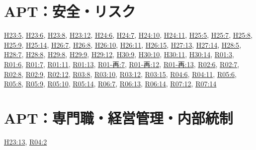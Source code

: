 \section{APT：安全・リスク}
\hyperref[q:h23-reg-apt-05]{H23:5}, \hyperref[q:h23-reg-apt-06]{H23:6}, \hyperref[q:h23-reg-apt-08]{H23:8}, \hyperref[q:h23-reg-apt-12]{H23:12}, \hyperref[q:h24-reg-apt-06]{H24:6}, \hyperref[q:h24-reg-apt-07]{H24:7}, \hyperref[q:h24-reg-apt-10]{H24:10}, \hyperref[q:h24-reg-apt-11]{H24:11}, \hyperref[q:h25-reg-apt-05]{H25:5}, \hyperref[q:h25-reg-apt-07]{H25:7}, \hyperref[q:h25-reg-apt-08]{H25:8}, \hyperref[q:h25-reg-apt-09]{H25:9}, \hyperref[q:h25-reg-apt-14]{H25:14}, \hyperref[q:h26-reg-apt-07]{H26:7}, \hyperref[q:h26-reg-apt-08]{H26:8}, \hyperref[q:h26-reg-apt-10]{H26:10}, \hyperref[q:h26-reg-apt-11]{H26:11}, \hyperref[q:h26-reg-apt-15]{H26:15}, \hyperref[q:h27-reg-apt-13]{H27:13}, \hyperref[q:h27-reg-apt-14]{H27:14}, \hyperref[q:h28-reg-apt-05]{H28:5}, \hyperref[q:h28-reg-apt-07]{H28:7}, \hyperref[q:h28-reg-apt-08]{H28:8}, \hyperref[q:h29-reg-apt-08]{H29:8}, \hyperref[q:h29-reg-apt-09]{H29:9}, \hyperref[q:h29-reg-apt-12]{H29:12}, \hyperref[q:h30-reg-apt-09]{H30:9}, \hyperref[q:h30-reg-apt-10]{H30:10}, \hyperref[q:h30-reg-apt-11]{H30:11}, \hyperref[q:h30-reg-apt-14]{H30:14}, \hyperref[q:r01-reg-apt-03]{R01:3}, \hyperref[q:r01-reg-apt-06]{R01:6}, \hyperref[q:r01-reg-apt-07]{R01:7}, \hyperref[q:r01-reg-apt-11]{R01:11}, \hyperref[q:r01-reg-apt-13]{R01:13}, \hyperref[q:r01-ret-apt-07]{R01-再:7}, \hyperref[q:r01-ret-apt-12]{R01-再:12}, \hyperref[q:r01-ret-apt-13]{R01-再:13}, \hyperref[q:r02-reg-apt-06]{R02:6}, \hyperref[q:r02-reg-apt-07]{R02:7}, \hyperref[q:r02-reg-apt-08]{R02:8}, \hyperref[q:r02-reg-apt-09]{R02:9}, \hyperref[q:r02-reg-apt-12]{R02:12}, \hyperref[q:r03-reg-apt-08]{R03:8}, \hyperref[q:r03-reg-apt-10]{R03:10}, \hyperref[q:r03-reg-apt-12]{R03:12}, \hyperref[q:r03-reg-apt-15]{R03:15}, \hyperref[q:r04-reg-apt-06]{R04:6}, \hyperref[q:r04-reg-apt-11]{R04:11}, \hyperref[q:r05-reg-apt-06]{R05:6}, \hyperref[q:r05-reg-apt-08]{R05:8}, \hyperref[q:r05-reg-apt-09]{R05:9}, \hyperref[q:r05-reg-apt-10]{R05:10}, \hyperref[q:r05-reg-apt-14]{R05:14}, \hyperref[q:r06-reg-apt-07]{R06:7}, \hyperref[q:r06-reg-apt-13]{R06:13}, \hyperref[q:r06-reg-apt-14]{R06:14}, \hyperref[q:r07-reg-apt-12]{R07:12}, \hyperref[q:r07-reg-apt-14]{R07:14}
\section{APT：専門職・経営管理・内部統制}
\hyperref[q:h23-reg-apt-13]{H23:13}, \hyperref[q:r04-reg-apt-02]{R04:2}
